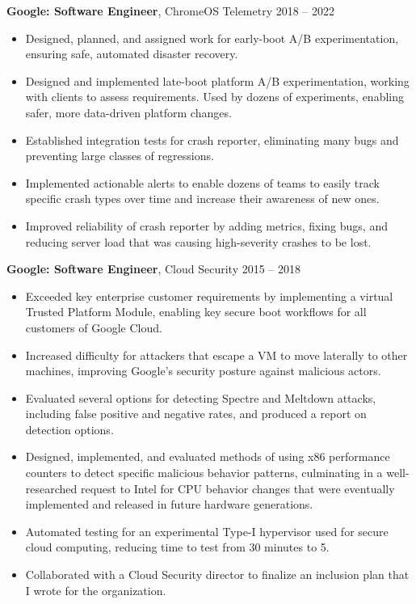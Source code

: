 \documentclass[overlapped]{res}
\newcommand{\experience}[5]{
    \textbf{#3}, #4 \hfill #1 -- #2 \\
    #5
}
\begin{document}
\begin{resume}
  \experience{2018}{2022}{Google: Software Engineer}{ChromeOS Telemetry}{
    \begin{itemize} \itemsep -1pt
        \item Designed, planned, and assigned work for early-boot A/B
          experimentation, ensuring safe, automated disaster recovery.
       \item Designed and implemented late-boot platform A/B experimentation,
         working with clients to assess requirements. Used by dozens of
         experiments, enabling safer, more data-driven platform changes.
        \item Established integration tests for crash reporter, eliminating many
          bugs and preventing large classes of regressions.
        \item Implemented actionable alerts to enable dozens of teams to easily
          track specific crash types over time and increase their awareness of
          new ones.
        \item Improved reliability of crash reporter by adding metrics, fixing
          bugs, and reducing server load that was causing high-severity crashes
          to be lost.
    \end{itemize}
  }

  \experience{2015}{2018}{Google: Software Engineer}{Cloud Security}{
    \begin{itemize} \itemsep -1pt
        \item Exceeded key enterprise customer requirements by implementing
          a virtual Trusted Platform Module, enabling key secure boot workflows
          for all customers of Google Cloud.
        \item Increased difficulty for attackers that escape a VM to move
          laterally to other machines, improving Google's security posture
          against malicious actors.
        \item Evaluated several options for detecting Spectre and Meltdown
          attacks, including false positive and negative rates, and produced a
          report on detection options.
        \item Designed, implemented, and evaluated methods of using x86
          performance counters to detect specific malicious behavior patterns,
          culminating in a well-researched request to Intel for CPU behavior
          changes that were eventually implemented and released in future
          hardware generations.
        \item Automated testing for an experimental Type-I hypervisor used for
          secure cloud computing, reducing time to test from 30 minutes to 5.
        \item Collaborated with a Cloud Security director to finalize an
          inclusion plan that I wrote for the organization.
    \end{itemize}
  }


\end{resume}
\end{document}
